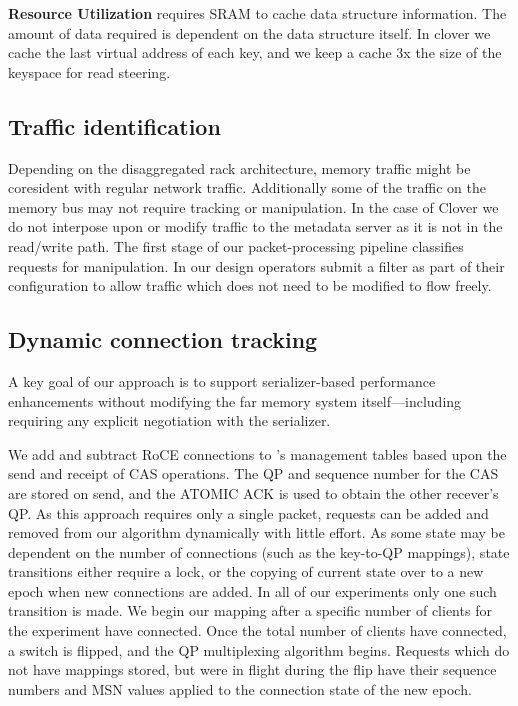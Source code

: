 \textbf{Resource Utilization} {\sword} requires SRAM to cache data structure
information. The amount of data required is dependent on the data structure
itself. In clover we cache the last virtual address of each key, and we keep a
cache 3x the size of the keyspace for read steering.




\subsection{Traffic identification} Depending on the disaggregated
rack architecture, memory traffic might be coresident with regular
network traffic.  Additionally some of the traffic on the memory bus
may not require tracking or manipulation. In the case of Clover we do
not interpose upon or modify traffic to the metadata server as it is
not in the read/write path. The first stage of our packet-processing
pipeline classifies requests for manipulation. In our design operators
submit a filter as part of their configuration to allow traffic which does
not need to be modified to flow freely.

\subsection{Dynamic connection tracking}
A key goal of our approach is to support serializer-based performance
enhancements without modifying the far memory system
itself---including requiring any explicit negotiation with the
serializer.

We add and subtract RoCE connections to {\sword}'s management tables
based upon the send and receipt of CAS operations. The QP and
sequence number for the CAS are stored on send, and the ATOMIC ACK is
used to obtain the other recever's QP. As this approach requires only
a single packet, requests can be added and removed from our algorithm
dynamically with little effort.
As some state may be dependent on the number of connections (such as
the key-to-QP mappings), state transitions either require a lock, or
the copying of current state over to a new epoch when new connections
are added. In all of our experiments only one such transition is
made. We begin our mapping after a specific number of clients for the
experiment have connected. Once the total number of clients have
connected, a switch is flipped, and the QP multiplexing algorithm
begins. Requests which do not have mappings stored, but were in flight
during the flip have their sequence numbers and MSN values applied to
the connection state of the new epoch.

